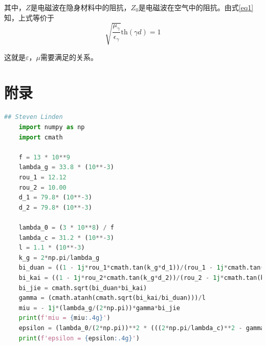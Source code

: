 \documentclass[a4paper]{article}
\begin{document}
其中，$Z$是电磁波在隐身材料中的阻抗，$Z_0$是电磁波在空气中的阻抗。由式\ref{eq1} 知，上式等价于
\begin{equation}
	\sqrt{\frac{\mu_\gamma}{\epsilon_\gamma}}\text{th}(\gamma d) = 1
\end{equation}

这就是$\varepsilon$，$\mu$需要满足的关系。

\section{附录}
\begin{lstlisting}[style=mystyle, language=Python, caption={数据处理代码}, label={lst:python_example}]
	## Steven Linden
	import numpy as np
	import cmath
	
	f = 13 * 10**9
	lambda_g = 33.8 * (10**-3)
	rou_1 = 12.12
	rou_2 = 10.00
	d_1 = 79.8* (10**-3)
	d_2 = 79.8* (10**-3)
	
	lambda_0 = (3 * 10**8) / f
	lambda_c = 31.2 * (10**-3)
	l = 1.1 * (10**-3)
	k_g = 2*np.pi/lambda_g
	bi_duan = ((1 - 1j*rou_1*cmath.tan(k_g*d_1))/(rou_1 - 1j*cmath.tan(k_g*d_1)))
	bi_kai = ((1 - 1j*rou_2*cmath.tan(k_g*d_2))/(rou_2 - 1j*cmath.tan(k_g*d_2)))
	bi_jie = cmath.sqrt(bi_duan*bi_kai)
	gamma = (cmath.atanh(cmath.sqrt(bi_kai/bi_duan)))/l
	miu = - 1j*(lambda_g/(2*np.pi))*gamma*bi_jie
	print(f'miu = {miu:.4g}')
	epsilon = (lambda_0/(2*np.pi))**2 * (((2*np.pi/lambda_c)**2 - gamma**2)/miu)
	print(f'epsilon = {epsilon:.4g}')
\end{lstlisting}

\nocite{jiaocai}

\end{document}
